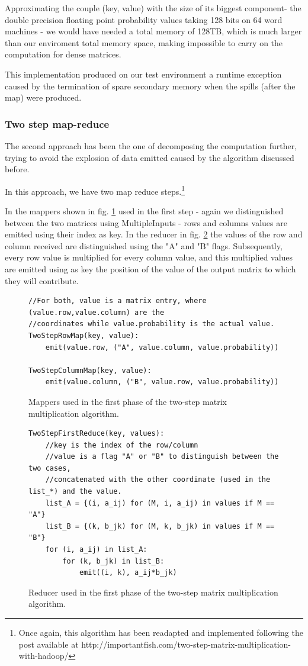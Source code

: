 Approximating the couple (key, value) with the size of its biggest component-
the double precision floating point probability values taking 128 bits on 64 word
machines - we would have needed a total memory of 128TB, which is much larger than
our enviroment total memory space, making impossible to carry on the computation
for dense matrices.

This implementation produced on our test environment a runtime exception caused by the termination
of spare secondary memory when the spills (after the map) were produced.

\subsubsection{Two step map-reduce}
The second approach has been the one of decomposing the computation further, trying to avoid
the explosion of data emitted caused by the algorithm discussed before.

In this approach, we have two map reduce steps.\footnote{Once again, this algorithm has been readapted and implemented
following the post available at http://importantfish.com/two-step-matrix-multiplication-with-hadoop/}

In the mappers shown in fig. \ref{fig:twoStep1Map} used in the first step - again we distinguished between the two matrices using MultipleInputs - rows and columns values are emitted using their index as key.
In the reducer in fig. \ref{fig:twoStep1Reducer} the values of the row and column received are distinguished using the "A" and "B" flags. Subsequently,
every row value is multiplied for every column value, and this multiplied values are emitted using as key
the position of the value of the output matrix to which they will contribute. %
\begin{figure}[H]
\begin{verbatim}
//For both, value is a matrix entry, where (value.row,value.column) are the
//coordinates while value.probability is the actual value.
TwoStepRowMap(key, value):
    emit(value.row, ("A", value.column, value.probability))

TwoStepColumnMap(key, value):
    emit(value.column, ("B", value.row, value.probability))
\end{verbatim}
\caption{Mappers used in the first phase of the two-step matrix multiplication algorithm.}
\label{fig:twoStep1Map}
\end{figure}
\begin{figure}[H]
\begin{verbatim}
TwoStepFirstReduce(key, values):
    //key is the index of the row/column
    //value is a flag "A" or "B" to distinguish between the two cases,
    //concatenated with the other coordinate (used in the list_*) and the value. 
    list_A = {(i, a_ij) for (M, i, a_ij) in values if M == "A"}
    list_B = {(k, b_jk) for (M, k, b_jk) in values if M == "B"}
    for (i, a_ij) in list_A:
        for (k, b_jk) in list_B:
            emit((i, k), a_ij*b_jk)
\end{verbatim}
\caption{Reducer used in the first phase of the two-step matrix multiplication algorithm.}
\label{fig:twoStep1Reducer}
\end{figure}

